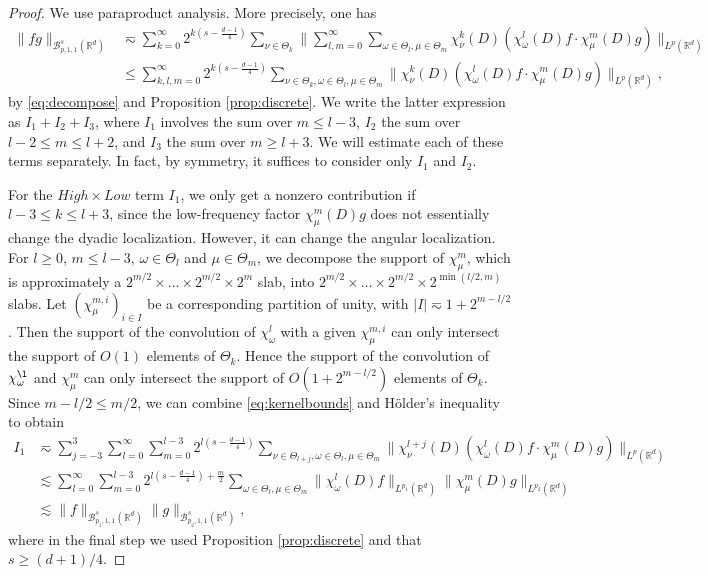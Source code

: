 \documentclass{amsart}
\theoremstyle{definition}
\newcommand {\Rd}{\mathbb{R}^{d}}
\newcommand {\w}{\omega}
\newcommand {\Ba}{\mathcal{B}}
\numberwithin{equation}{section}
\begin{document}
\begin{proof}
We use paraproduct analysis. More precisely, one has
\begin{align*}
\|fg\|_{\Ba^{s}_{p,1,1}(\Rd)}&\eqsim\!\sum_{k=0}^{\infty}2^{k(s-\frac{d-1}{4})}\!\sum_{\nu\in\Theta_{k}}\!\Big\|\!\sum_{l,m=0}^{\infty}\sum_{\w\in\Theta_{l},\mu\in\Theta_{m}}\!\chi_{\nu}^{k}(D)(\chi_{\w}^{l}(D)f \!\cdot\!\chi_{\mu}^{m}(D)g)\Big\|_{L^{p}(\Rd)}\\
&\leq \!\sum_{k,l,m=0}^{\infty}2^{k(s-\frac{d-1}{4})}\!\sum_{\nu\in\Theta_{k},\w\in\Theta_{l},\mu\in\Theta_{m}}\|\chi_{\nu}^{k}(D)(\chi_{\w}^{l}(D)f \cdot \chi_{\mu}^{m}(D)g)\|_{L^{p}(\Rd)},
\end{align*}
by \eqref{eq:decompose} and Proposition \ref{prop:discrete}. We write the latter expression as $I_{1}+I_{2}+I_{3}$, where $I_{1}$ involves the sum over $m\leq  l-3$, $I_{2}$ the sum over $l-2\leq m\leq l+2$, and $I_{3}$ the sum over $m\geq l+3$. We will estimate each of these terms separately. In fact, by symmetry, it suffices to consider only $I_{1}$ and $I_{2}$.

For the $High \times Low$ term $I_{1}$, we only get a nonzero contribution if $l-3\leq k\leq l+3$, since the low-frequency factor $\chi_{\mu}^{m}(D)g$ does not essentially change the dyadic localization. However, it can change the angular localization. For $l\geq0$, $m\leq l-3$, $\w\in\Theta_{l}$ and $\mu\in\Theta_{m}$, we decompose the support of $\chi_{\mu}^{m}$, which is approximately a $2^{m/2} \times \ldots \times 2^{m/2} \times 2^{m}$ slab, into $2^{m/2} \times \ldots \times 2^{m/2} \times 2^{\min(l/2,m)}$ slabs. Let $(\chi_\mu^{m,i})_{i\in I}$ be a corresponding partition of unity, with $|I| \eqsim  1+2^{m-l/2}$. Then the support of the convolution of $\chi_{\w}^{l}$ with a given $\chi_{\mu}^{m,i}$ can only intersect the support of $O(1)$ elements of $\Theta_{k}$. Hence the support of the convolution of $\chi_{\w}^{\l}$ and $\chi_{\mu}^{m}$ can only intersect the support of
$O(1+2^{m-l/2})$ elements of $\Theta_{k}$. Since $m-l/2\leq m/2$, we can combine \eqref{eq:kernelbounds} and H\"{o}lder's inequality to obtain
\begin{align*}
I_{1}&\eqsim \sum_{j=-3}^{3}\sum_{l=0}^{\infty}\sum_{m=0}^{l-3}2^{l(s-\frac{d-1}{4})}\sum_{\nu\in\Theta_{l+j},\w\in\Theta_{l},\mu\in\Theta_{m}}\|\chi_{\nu}^{l+j}(D)(\chi_{\w}^{l}(D)f \cdot \chi_{\mu}^{m}(D)g)\|_{L^{p}(\Rd)}\\
&\lesssim \sum_{l=0}^{\infty}\sum_{m=0}^{l-3}2^{l(s-\frac{d-1}{4})+\frac{m}{2}}\sum_{\w\in\Theta_{l},\mu\in\Theta_{m}}\|\chi_{\w}^{l}(D)f\|_{L^{p_{1}}(\Rd)}\|\chi_{\mu}^{m}(D)g\|_{L^{p_{2}}(\Rd)}\\
&\lesssim \|f\|_{\Ba^{s}_{p_{1},1,1}(\Rd)}\|g\|_{\Ba^{s}_{p_{2},1,1}(\Rd)},
\end{align*}
where in the final step we used Proposition \ref{prop:discrete} and that $s\geq (d+1)/4$.


\end{proof}
\end{document}
